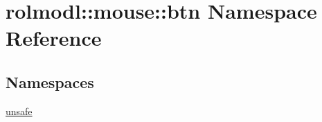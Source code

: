 \hypertarget{namespacerolmodl_1_1mouse_1_1btn}{}\section{rolmodl\+::mouse\+::btn Namespace Reference}
\label{namespacerolmodl_1_1mouse_1_1btn}
\subsection*{Namespaces}
\begin{DoxyCompactItemize}
\item 
 \mbox{\hyperlink{namespacerolmodl_1_1mouse_1_1btn_1_1unsafe}{unsafe}}
\end{DoxyCompactItemize}
